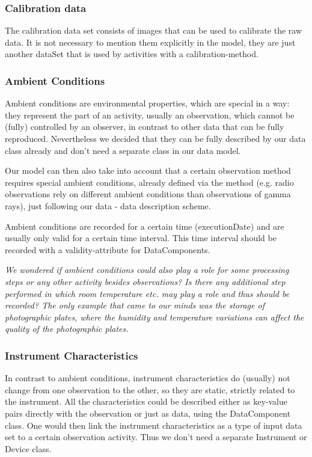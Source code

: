 \documentclass[11pt,a4paper]{ivoa}
\begin{document}
\subsubsection{Calibration data}
The calibration data set consists of images that can be used to calibrate the
raw data. It is not necessary to mention them explicitly in the model, they are just another dataSet that is used by activities with a calibration-method.


\subsubsection{Ambient Conditions}

Ambient conditions are environmental properties, which are special in a way: 
they represent the part of an activity, usually an observation, which cannot be 
(fully) controlled by an
observer, in contrast to other data that can be fully reproduced.
Nevertheless we decided that they can be fully described by our 
data class already and don't need a separate class in our data model. 

Our model can then also take into account that a certain observation
method requires special ambient conditions, already defined via the method
(e.g. radio observations rely on different ambient conditions than observations
of gamma rays), just following our data - data description scheme.


Ambient conditions are recorded for a certain time (executionDate) and are
usually only valid for a certain time interval. This time interval should be recorded
with a validity-attribute for DataComponents.


\emph{We wondered if ambient conditions could also play a role for some
processing steps or any other activity besides observations? Is there any
additional step performed in which room temperature etc. may play a role and thus
should be recorded? The only example that came to our minds was the storage of
photographic plates, where the humidity and temperature variations can affect the
quality of the photographic plates.}



\subsubsection{Instrument Characteristics}
In contrast to ambient conditions, instrument characteristics do (usually) not
change from one observation to the other, so they are static, strictly related to
the instrument. 
All the characteristics could be described either as key-value pairs directly with the 
observation or just as data, using the DataComponent class. One would then 
link the instrument characteristics as a type of input data set to a certain 
observation activity. Thus we don't need a separate Instrument or Device class.
\end{document}
